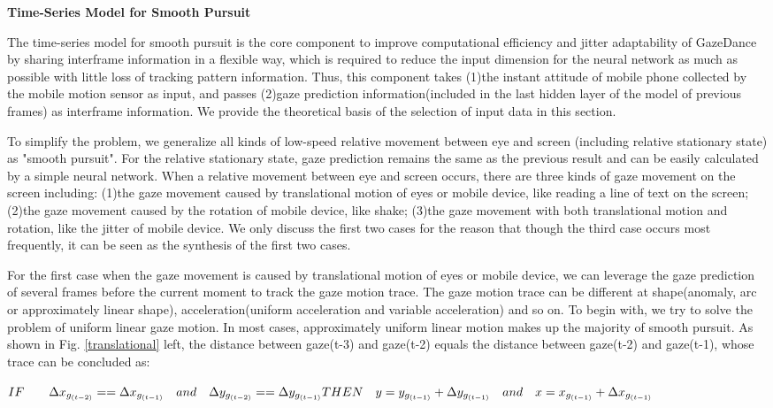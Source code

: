 \documentclass[acmlarge]{acmart}
\begin{document}
\textbf{Time-Series Model for Smooth Pursuit} \label{smooth}

The time-series model for smooth pursuit is the core component to improve computational efficiency and jitter adaptability of GazeDance by sharing interframe information in a flexible way, which is required to reduce the input dimension for the neural network as much as possible with little loss of tracking pattern information. Thus, this component takes (1)the instant attitude of mobile phone collected by the mobile motion sensor as input, and passes (2)gaze prediction information(included in the last hidden layer of the model of previous frames) as interframe information. We provide the theoretical basis of the selection of input data in this section. 

To simplify the problem, we generalize all kinds of low-speed relative movement between eye and screen (including relative stationary state) as "smooth pursuit". For the relative stationary state, gaze prediction remains the same as the previous result and can be easily calculated by a simple neural network. When a relative movement between eye and screen occurs, there are three kinds of gaze movement on the screen including: (1)the gaze movement caused by translational motion of eyes or mobile device, like reading a line of text on the screen; (2)the gaze movement caused by the rotation of mobile device, like shake; (3)the gaze movement with both translational motion and rotation, like the jitter of mobile device. We only discuss the first two cases for the reason that though the third case occurs most frequently, it can be seen as the synthesis of the first two cases.

For the first case when the gaze movement is caused by translational motion of eyes or mobile device, we can leverage the gaze prediction of several frames before the current moment to track the gaze motion trace. The gaze motion trace can be different at shape(anomaly, arc or approximately linear shape), acceleration(uniform acceleration and variable acceleration) and so on. To begin with, we try to solve the problem of uniform linear gaze motion. In most cases, approximately uniform linear motion makes up the majority of smooth pursuit. As shown in Fig. \ref{translational} left, the distance between gaze(t-3) and gaze(t-2) equals the distance between gaze(t-2) and gaze(t-1),  whose trace can be concluded as:

\begin{center}
\begin{math}
IF \qquad \Delta x_{g_{(t-2)}} == \Delta x_{g_{(t-1)}} \quad and \quad \Delta y_{g_{(t-2)}} == \Delta y_{g_{(t-1)}} \\
THEN  \quad y = y_{g_{(t-1)}} + \Delta y_{g_{(t-1)}}\quad and \quad x = x_{g_{(t-1)}} + \Delta x_{g_{(t-1)}}
\end{math}
\end{center}
\end{document}

